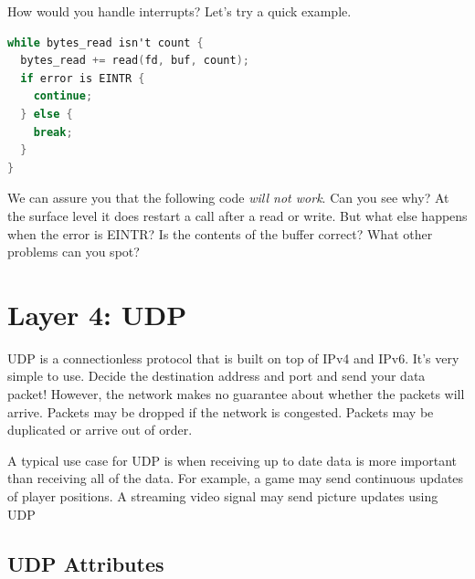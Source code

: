 How would you handle interrupts?
Let's try a quick example.

\begin{lstlisting}[language=C]
while bytes_read isn't count {
  bytes_read += read(fd, buf, count);
  if error is EINTR {
    continue;
  } else {
    break;
  }
}
\end{lstlisting}

We can assure you that the following code \textit{will not work}.
Can you see why?
At the surface level it does restart a call after a read or write.
But what else happens when the error is EINTR?
Is the contents of the buffer correct?
What other problems can you spot?

\section{Layer 4: UDP}

UDP is a connectionless protocol that is built on top of IPv4 and IPv6.
It's very simple to use.
Decide the destination address and port and send your data packet!
However, the network makes no guarantee about whether the packets will arrive.
Packets may be dropped if the network is congested.
Packets may be duplicated or arrive out of order.

A typical use case for UDP is when receiving up to date data is more important than receiving all of the data.
For example, a game may send continuous updates of player positions.
A streaming video signal may send picture updates using UDP

\subsection{UDP Attributes}

